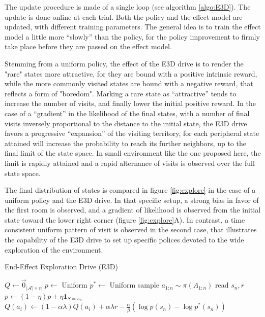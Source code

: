 \documentclass[runningheads]{llncs}
\begin{document}
The update procedure is made of a single loop (see algorithm \ref{algo:E3D}). The update is done online at each trial. Both the policy and the effect model are updated, with different training parameters. The general idea is to train the effect model a little more ``slowly'' than the policy, for the policy improvement to firmly take place before they are passed on the effect model. 

Stemming from a uniform policy, the effect of the E3D drive is to render the "rare" states more
attractive, for they are bound with a positive intrinsic reward, while the more commonly visited 
 states are bound with a negative reward, that reflects a form of "boredom". Marking a rare state as ``attractive'' tends to increase the number of visits, and finally lower the initial positive reward. In the case of a ``gradient'' in the likelihood of the final states, with a number of final visits inversely proportional to the distance to the initial state, the E3D drive favors a progressive ``expansion'' of the visiting territory, for each peripheral state attained will increase the probability to reach its further neighbors, up to the final limit of the state space. In small environment like the one proposed here, the limit is rapidly attained and a rapid alternance of visits is observed over the full state space. 

The final distribution of states is compared in figure \ref{fig:explore} in the case of a uniform policy and the E3D drive. In that specific setup, a strong bias in favor of the first room is observed, and a gradient of likelihood is observed from the initial state toward the lower right corner (figure \ref{fig:explore}A). In contrast, a time consistent uniform pattern of visit is observed in the second case, that illustrates the capability of the E3D drive to set up specific polices devoted to the wide exploration of the environment.     

\begin{algorithm}[t]
	\caption{End-Effect Exploration Drive (E3D)}\label{algo:E3D}
	\begin{algorithmic}
		\REQUIRE{$\alpha$, $\beta$, $\lambda$, $\eta$}
		\STATE $Q \leftarrow \vec{0}_{|\mathcal{A}|\times n}$
		\STATE $p \leftarrow$ Uniform
		\STATE $p^* \leftarrow$ Uniform
			\STATE sample $a_{1:n} \sim \pi(A_{1:n})$ 
			\STATE read $s_n,r$
			\STATE $p \leftarrow (1-\eta) p + \eta \mathbf{1}_{S=s_n} $ 
			    \STATE $Q(a_i) \leftarrow (1-\alpha\lambda) Q(a_i) + \alpha\lambda r - \frac{\alpha}{\beta} (\log p(s_n)-\log p^*(s_n))$ 
			\ENDFOR
		\ENDWHILE
	\end{algorithmic}
\end{algorithm}
\end{document}
